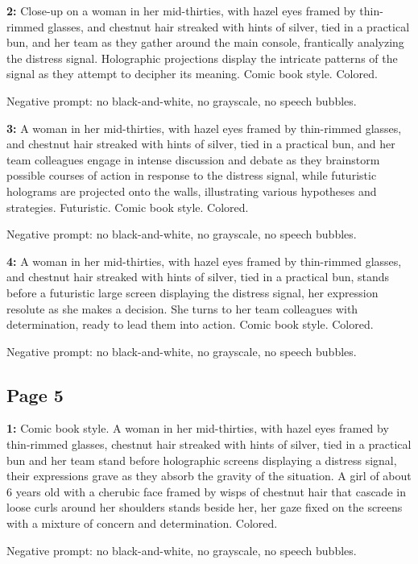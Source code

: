 \begin{iquote}
    \textbf{2:} Close-up on a woman in her mid-thirties, with hazel eyes framed by thin-rimmed glasses, and chestnut hair streaked with hints of silver, tied in a practical bun, and her team as they gather around the main console, frantically analyzing the distress signal. Holographic projections display the intricate patterns of the signal as they attempt to decipher its meaning. Comic book style. Colored.

    \noindent Negative prompt: no black-and-white, no grayscale, no speech bubbles.
\end{iquote}

\begin{iquote}
    \textbf{3:} A woman in her mid-thirties, with hazel eyes framed by thin-rimmed glasses, and chestnut hair streaked with hints of silver, tied in a practical bun, and her team colleagues engage in intense discussion and debate as they brainstorm possible courses of action in response to the distress signal, while futuristic holograms are projected onto the walls, illustrating various hypotheses and strategies. Futuristic. Comic book style. Colored.

    \noindent Negative prompt: no black-and-white, no grayscale, no speech bubbles.
\end{iquote}

\begin{iquote}
    \textbf{4:} A woman in her mid-thirties, with hazel eyes framed by thin-rimmed glasses, and chestnut hair streaked with hints of silver, tied in a practical bun, stands before a futuristic large screen displaying the distress signal, her expression resolute as she makes a decision. She turns to her team colleagues with determination, ready to lead them into action. Comic book style. Colored.

    \noindent Negative prompt: no black-and-white, no grayscale, no speech bubbles.
\end{iquote}


\subsection*{Page 5}
\begin{iquote}
    \textbf{1:} Comic book style. A woman in her mid-thirties, with hazel eyes framed by thin-rimmed glasses, chestnut hair streaked with hints of silver, tied in a practical bun and her team stand before holographic screens displaying a distress signal, their expressions grave as they absorb the gravity of the situation. A girl of about 6 years old with a cherubic face framed by wisps of chestnut hair that cascade in loose curls around her shoulders stands beside her, her gaze fixed on the screens with a mixture of concern and determination. Colored.

    \noindent Negative prompt: no black-and-white, no grayscale, no speech bubbles.
\end{iquote}

